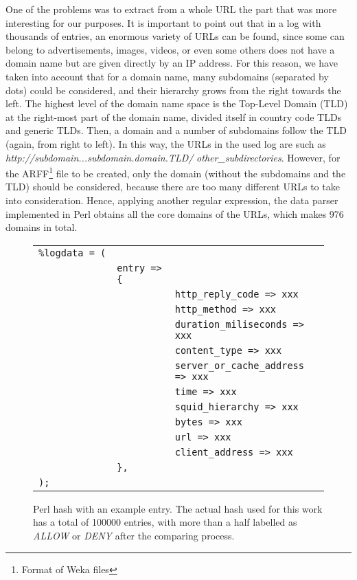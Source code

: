 \documentclass{llncs}
\begin{document}
One of the problems was to extract from a whole URL the part that was
more interesting for our purposes. It is important to point out that
in a log with thousands of entries, an enormous variety of URLs can be
found, since some can belong to advertisements, images, videos, or
even some others does not have a domain name but are given directly by
an IP address. For this reason, we have taken into account that for a
domain name, many subdomains (separated by dots) could be considered,
and their hierarchy grows from the right towards the left. The highest
level of the domain name space is the Top-Level Domain (TLD) at the
right-most part of the domain name, divided itself in country code
TLDs and generic TLDs. Then, a domain and a number of subdomains
follow the TLD (again, from right to left). In this way, the URLs in the
used log are such as \textit{http://subdomain...subdomain.domain.TLD/}
\textit{other\_subdirectories}. However, for the ARFF\footnote{Format
  of Weka files} file to be created, only the domain (without the
subdomains and the TLD) should be considered, because there are too
many different URLs to take into consideration. Hence, applying
another regular expression, the data parser implemented in Perl
obtains all the core domains of the URLs, which makes 976 domains in
total. 

\begin{figure}[htb]
\centering
\begin{tabular}{ p{0.1cm} p{0.1cm} p{6cm} }
  \texttt{\%logdata~=~(} & & \\
   & \texttt{entry~=>\{} & \\
   & & \texttt{http\_reply\_code => xxx} \\
   & & \texttt{http\_method => xxx} \\
   & & \texttt{duration\_miliseconds => xxx} \\
   & & \texttt{content\_type => xxx} \\
   & & \texttt{server\_or\_cache\_address => xxx} \\
   & & \texttt{time => xxx} \\
   & & \texttt{squid\_hierarchy => xxx} \\
   & & \texttt{bytes => xxx} \\
   & & \texttt{url => xxx} \\
   & & \texttt{client\_address => xxx} \\
   & \texttt{\},} & \\
  \texttt{);} & & \\
\end{tabular}
\caption{Perl hash with an example entry. The actual hash used for this work has a total of 100000 entries, with more than a half labelled as \textit{ALLOW} or \textit{DENY} after the comparing process. \label{fig:data_hash}}
\end{figure}
\end{document}
